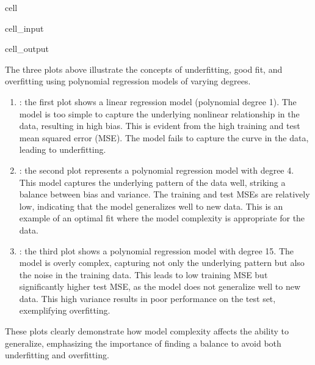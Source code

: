 \documentclass[letterpaper,10pt,english]{jupyterBook}
\begin{document}
\begin{sphinxuseclass}{cell}
\begin{sphinxVerbatimInput}
\begin{sphinxuseclass}{cell_input}
\end{sphinxuseclass}\end{sphinxVerbatimInput}
\begin{sphinxVerbatimOutput}

\begin{sphinxuseclass}{cell_output}
\noindent{}

\end{sphinxuseclass}\end{sphinxVerbatimOutput}

\end{sphinxuseclass}
\sphinxAtStartPar
The three plots above illustrate the concepts of underfitting, good fit, and overfitting using polynomial regression models of varying degrees.
\begin{enumerate}
%
\item {} 
\sphinxAtStartPar
{}: the first plot shows a linear regression model (polynomial degree 1). The model is too simple to capture the underlying nonlinear relationship in the data, resulting in high bias. This is evident from the high training and test mean squared error (MSE). The model fails to capture the curve in the data, leading to underfitting.

\item {} 
\sphinxAtStartPar
{}: the second plot represents a polynomial regression model with degree 4. This model captures the underlying pattern of the data well, striking a balance between bias and variance. The training and test MSEs are relatively low, indicating that the model generalizes well to new data. This is an example of an optimal fit where the model complexity is appropriate for the data.

\item {} 
\sphinxAtStartPar
{}: the third plot shows a polynomial regression model with degree 15. The model is overly complex, capturing not only the underlying pattern but also the noise in the training data. This leads to low training MSE but significantly higher test MSE, as the model does not generalize well to new data. This high variance results in poor performance on the test set, exemplifying overfitting.

\end{enumerate}

\sphinxAtStartPar
These plots clearly demonstrate how model complexity affects the ability to generalize, emphasizing the importance of finding a balance to avoid both underfitting and overfitting.
\end{document}

